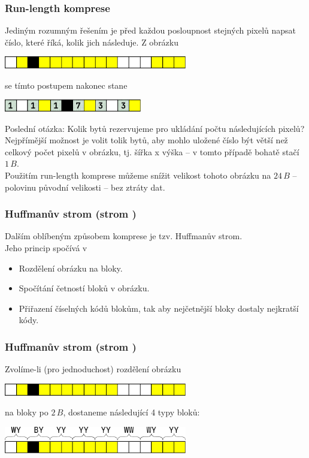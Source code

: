 \documentclass[aspectratio=169,11pt,svgnames]{beamer}
\begin{document}
\begin{frame}
 \frametitle{Run-length komprese}
 Jediným rozumným řešením je před každou posloupnost stejných pixelů napsat
 číslo, které říká, kolik jich následuje.
 \pause
 Z obrázku
 \begin{center}
  \includegraphics[width=8cm]{image-4.pdf}
  \vspace*{-.5em}
 \end{center}
 se tímto postupem nakonec stane
 \pause
 \begin{center}
  \includegraphics[width=6cm]{image-6.pdf}
  \vspace*{-.5em}
 \end{center}
 \pause
 Poslední otázka: Kolik bytů rezervujeme pro ukládání počtu následujících
 pixelů?\pause\\
 Nejpřímější možnost je volit tolik bytů, aby mohlo uložené číslo být větší než
 celkový počet pixelů v obrázku, tj. šířka x výška -- v tomto případě bohatě
 stačí $1\,B$.\pause\\
 Použitím \alert{run-length} komprese můžeme snížit velikost tohoto obrázku na
 $24\,B$ -- polovinu původní velikosti -- \alert{bez ztráty dat}.
\end{frame}

\begin{frame}
 \frametitle{Huffmanův strom (strom )}
 Dalším oblíbeným způsobem komprese je tzv. \alert{Huffmanův strom}.\pause\\
 Jeho princip spočívá v
 \begin{itemize}[label=\textbullet]
  \item Rozdělení obrázku na bloky.
  \pause
  \item Spočítání četností bloků v obrázku.
  \pause
  \item Přiřazení číselných kódů blokům, tak aby \alert{nejčetnější bloky
   dostaly nejkratší kódy}.
 \end{itemize}
\end{frame}

\begin{frame}
 \frametitle{Huffmanův strom (strom )}
 Zvolíme-li (pro jednoduchost) rozdělení obrázku
 \begin{center}
  \includegraphics[width=8cm]{image-4.pdf}
  \vspace*{-.5em}
 \end{center}
 na bloky po $2\,B$, dostaneme následující 4 typy bloků:
 \begin{center}
  \includegraphics[width=8cm]{image-7.pdf}
  \vspace*{-.5em}
 \end{center}
\end{frame}
\end{document}
